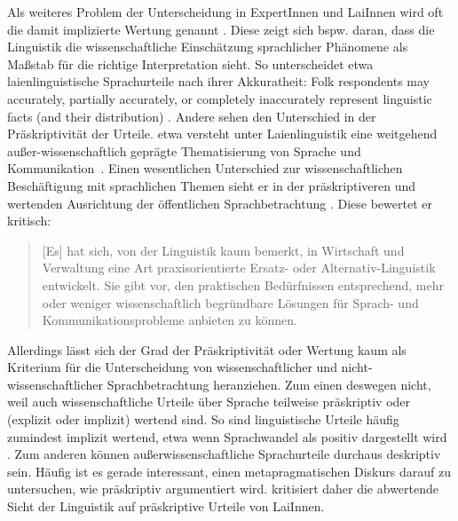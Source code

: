 Als weiteres Problem der Unterscheidung in ExpertInnen und LaiInnen wird oft die damit implizierte Wertung genannt \citep[s.][320]{Spitzmuller2014}. 
Diese zeigt sich bspw. daran, dass die Linguistik die wissenschaftliche Einschätzung sprachlicher Phänomene als Maßstab für die \glqq richtige\grqq{} Interpretation sieht. 
So unterscheidet etwa \citet{Preston2004} laienlinguistische Sprachurteile nach ihrer Akkuratheit: \glqq Folk respondents may accurately, partially accurately, or completely inaccurately represent linguistic facts (and their distribution)\grqq{} \citep[45]{Preston2004}. 
Andere sehen den Unterschied in der Präskriptivität der Urteile.  
\citeauthor{Antos1996} etwa versteht unter Laienlinguistik {\glqq}eine weitgehend au{\ss}er-wissenschaftlich gepr{\"a}gte Thematisierung von Sprache und Kommunikation{\grqq}~\citep[25--26]{Antos1996}. 
Einen wesentlichen Unterschied zur wissenschaftlichen Beschäftigung mit sprachlichen Themen sieht er in der präskriptiveren und wertenden Ausrichtung der öffentlichen Sprachbetrachtung \citep[19--20, 36]{Antos1996}. 
Diese bewertet er kritisch: 
\begin{quote}[Es] hat sich, von der Linguistik kaum bemerkt, in Wirtschaft und Verwaltung eine Art praxisorientierte {\glq}Ersatz-{\grq} oder {\glq}Alternativ-Linguistik{\grq} entwickelt. Sie gibt vor, den praktischen Bed{\"u}rfnissen entsprechend, mehr oder weniger wissenschaftlich begr{\"u}ndbare L{\"o}sungen f{\"u}r Sprach- und Kommunikationsprobleme anbieten zu k{\"o}nnen.~\citep[25]{Antos1996}\end{quote}
Allerdings lässt sich der Grad der Präskriptivität oder Wertung kaum als Kriterium für die Unterscheidung von wissenschaftlicher und nicht-wissenschaftlicher Sprachbetrachtung heranziehen. 
Zum einen deswegen nicht, weil auch wissenschaftliche Urteile über Sprache teilweise präskriptiv oder (explizit oder implizit) wertend sind. 
So sind linguistische Urteile häufig zumindest implizit wertend, etwa wenn Sprachwandel als positiv dargestellt wird \citep[s.][549--250]{Spitzmuller.2005}.
Zum anderen können außerwissenschaftliche Sprachurteile durchaus deskriptiv sein. 
Häufig ist es gerade interessant, einen metapragmatischen Diskurs darauf zu untersuchen, wie präskriptiv argumentiert wird. 
\citet[314]{Spitzmuller2014} kritisiert daher die abwertende Sicht der Linguistik auf präskriptive Urteile von LaiInnen. 


